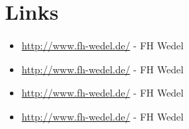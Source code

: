 \documentclass[a4paper,parskip=half,oneside]{scrbook}
\begin{document}
\chapter{Links}

\begin{itemize}
  \item \url{http://www.fh-wedel.de/} - FH Wedel
  \item \url{http://www.fh-wedel.de/} - FH Wedel
  \item \url{http://www.fh-wedel.de/} - FH Wedel
  \item \url{http://www.fh-wedel.de/} - FH Wedel
\end{itemize}
\end{document}
